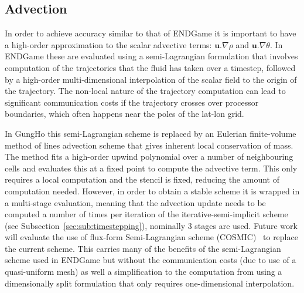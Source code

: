 \documentclass[review,times]{elsarticle}
\begin{document}
\subsection{Advection\label{sec:sub:advection}}
In order to achieve accuracy similar to that of ENDGame it is important to have 
a high-order approximation to the scalar advective terms: $\mathbf{u}.\nabla\rho$ 
and $\mathbf{u}.\nabla\theta$. In ENDGame these are evaluated using a 
semi-Lagrangian formulation that involves computation of the trajectories that 
the fluid has taken over a timestep, followed by a high-order multi-dimensional 
interpolation of the scalar field to the origin of the trajectory. 
The non-local nature of the trajectory computation can 
lead to significant communication costs if the trajectory crosses over processor 
boundaries, which often happens near the poles of the lat-lon grid.

In GungHo this semi-Lagrangian scheme is replaced by an Eulerian finite-volume 
method of lines advection scheme that gives inherent local conservation of mass.
The method fits a high-order upwind polynomial over a number of
neighbouring cells and evaluates this at a fixed point to compute the advective 
term. This only requires a local computation and the stencil is fixed, reducing the 
amount of computation needed. However, in order to obtain a stable scheme it is 
wrapped in a multi-stage evaluation, meaning that the advection update needs to be 
computed a number of times per iteration of the iterative-semi-implicit scheme
(see Subsection~\ref{sec:sub:timestepping}), nominally 3 stages are used. 
Future work will evaluate the use of flux-form Semi-Lagrangian scheme (COSMIC)~\cite{Leonard1996} 
to replace the current scheme. This carries many of the 
benefits of the semi-Lagrangian scheme used in ENDGame but without the 
communication costs (due to use of a quasi-uniform mesh) as well a simplification 
to the computation from using a dimensionally split formulation that only requires 
one-dimensional interpolation.
\end{document}
